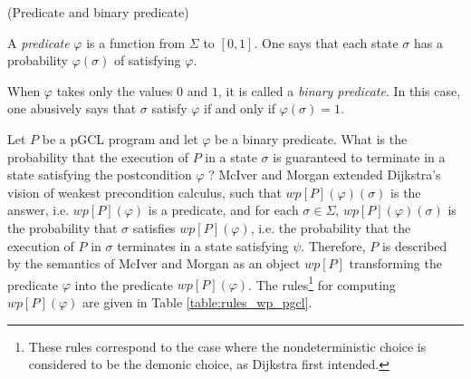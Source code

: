\documentclass[a4paper,10pt]{llncs}
\begin{document}
	\begin{definition}{\textnormal{(Predicate and binary predicate)}}
	\item A \emph{predicate} $\varphi$ is a function from $\Sigma$ to $[0,1]$. One says that each state $\sigma$ has a probability $\varphi(\sigma)$ of satisfying $\varphi$.
	\item When $\varphi$ takes only the values $0$ and $1$, it is called a \emph{binary predicate}. In this case, one abusively says that $\sigma$ satisfy $\varphi$ if and only if $\varphi(\sigma) = 1$.
	\end{definition}

    Let $P$ be a pGCL program and let $\varphi$ be a binary predicate.
	What is the probability that the execution of $P$ in a state $\sigma$ is guaranteed to terminate in a state satisfying the postcondition $\varphi$ ? McIver and Morgan extended Dijkstra's vision of weakest precondition calculus, such that $wp[P](\varphi)(\sigma)$ is the answer, i.e. $wp[P](\varphi)$ is a predicate, and for each $\sigma \in \Sigma$, $wp[P](\varphi)(\sigma)$ is the probability that $\sigma$ satisfies $wp[P](\varphi)$, i.e. the probability that the execution of $P$ in $\sigma$ terminates in a state satisfying $\psi$.\newline
	Therefore, $P$ is described by the semantics of McIver and Morgan as an object $wp[P]$ transforming the predicate $\varphi$ into the predicate $wp[P](\varphi)$. The rules\footnote{These rules correspond to the case where the nondeterministic choice is considered to be the demonic choice, as Dijkstra first intended.} for computing  $wp[P](\varphi)$ are given in Table \ref{table:rules_wp_pgcl}. 
	
\end{document}
